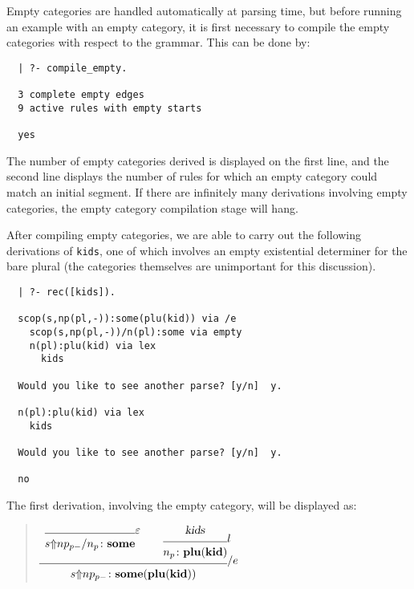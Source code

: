 Empty categories are handled automatically at parsing time, but
before running an example with an empty category, it is first
necessary to compile the empty categories with respect to the grammar.
This can be done by:
%
\begin{verbatim}
  | ?- compile_empty.

  3 complete empty edges
  9 active rules with empty starts

  yes
\end{verbatim}
%
The number of empty categories derived is displayed on the first line,
and the second line displays the number of rules for which an empty
category could match an initial segment.  If there are infinitely many
derivations involving empty categories, the empty category compilation
stage will hang.

After compiling empty categories, we are able to carry out the
following derivations of {\tt kids}, one of which involves an empty
existential determiner for the bare plural (the categories themselves
are unimportant for this discussion).
%
\begin{verbatim}
  | ?- rec([kids]).

  scop(s,np(pl,-)):some(plu(kid)) via /e
    scop(s,np(pl,-))/n(pl):some via empty
    n(pl):plu(kid) via lex
      kids
  
  Would you like to see another parse? [y/n]  y.

  n(pl):plu(kid) via lex
    kids

  Would you like to see another parse? [y/n]  y.

  no
\end{verbatim}
%
The first derivation, involving the empty
category, will be displayed as:
%
\begin{quote}
\small
$
\infr{\axr{\synsem{\fd{\scop{s}
                            {np_{p-}}}
                      {n_p}}
                  {\con{some}}}
           {\empr}
      \qquad
      \infr{\men{kids}}
           {\synsem{n_p}
                   {\con{plu}
                    (\con{kid})}}
           {\lexr}}
     {\synsem{\scop{s}
                   {np_{p-}}}
             {\con{some}
              (\con{plu}
               (\con{kid}))}}
     {\fel}
$
\end{quote}
%



